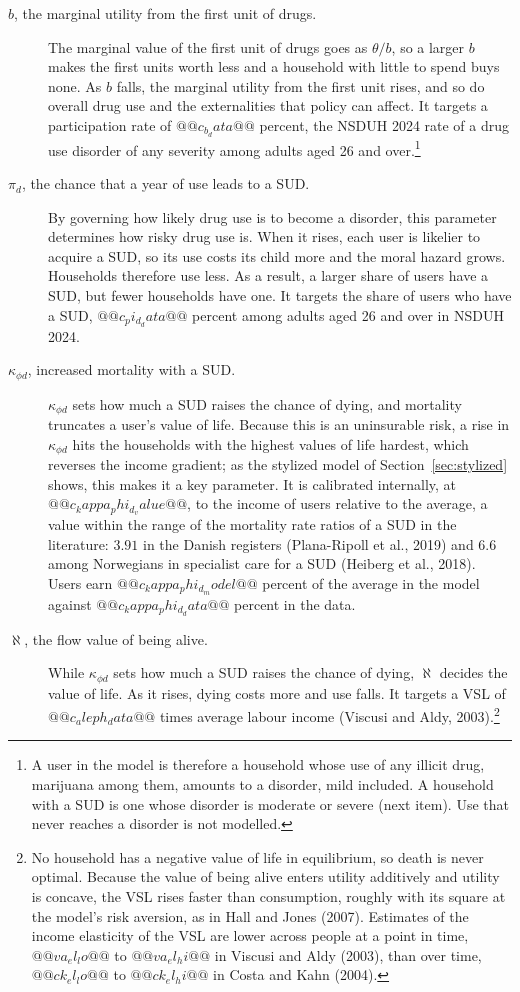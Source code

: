 \documentclass[10pt]{article}
\begin{document}
\begin{description}
\item[$b$, the marginal utility from the first unit of drugs.] The marginal value of the first unit of drugs goes as $\theta/b$, so a larger $b$ makes the first units worth less and a household with little to spend buys none. As $b$ falls, the marginal utility from the first unit rises, and so do overall drug use and the externalities that policy can affect. It targets a participation rate of $@@c_b_data@@$ percent, the NSDUH 2024 rate of a drug use disorder of any severity among adults aged 26 and over.\footnote{A user in the model is therefore a household whose use of any illicit drug, marijuana among them, amounts to a disorder, mild included. A household with a SUD is one whose disorder is moderate or severe (next item). Use that never reaches a disorder is not modelled.}
\item[$\pi_d$, the chance that a year of use leads to a SUD.] By governing how likely drug use is to become a disorder, this parameter determines how risky drug use is. When it rises, each user is likelier to acquire a SUD, so its use costs its child more and the moral hazard grows. Households therefore use less. As a result, a larger share of users have a SUD, but fewer households have one. It targets the share of users who have a SUD, $@@c_pi_d_data@@$ percent among adults aged 26 and over in NSDUH 2024.
\item[$\kappa_{\phi d}$, increased mortality with a SUD.] $\kappa_{\phi d}$ sets how much a SUD raises the chance of dying, and mortality truncates a user's value of life. Because this is an uninsurable risk, a rise in $\kappa_{\phi d}$ hits the households with the highest values of life hardest, which reverses the income gradient; as the stylized model of Section~\ref{sec:stylized} shows, this makes it a key parameter. It is calibrated internally, at $@@c_kappa_phi_d_value@@$, to the income of users relative to the average, a value within the range of the mortality rate ratios of a SUD in the literature: $3.91$ in the Danish registers (Plana-Ripoll et al., 2019) and $6.6$ among Norwegians in specialist care for a SUD (Heiberg et al., 2018). Users earn $@@c_kappa_phi_d_model@@$ percent of the average in the model against $@@c_kappa_phi_d_data@@$ percent in the data.
\item[$\aleph$, the flow value of being alive.]   While $\kappa_{\phi d}$ sets how much a SUD raises the chance of dying, $\aleph$ decides the value of life. As it rises, dying costs more and use falls. It targets a VSL of $@@c_aleph_data@@$ times average labour income (Viscusi and Aldy, 2003).\footnote{No household has a negative value of life in equilibrium, so death is never optimal. Because the value of being alive enters utility additively and utility is concave, the VSL rises faster than consumption, roughly with its square at the model's risk aversion, as in Hall and Jones (2007). Estimates of the income elasticity of the VSL are lower across people at a point in time, $@@va_el_lo@@$ to $@@va_el_hi@@$ in Viscusi and Aldy (2003), than over time, $@@ck_el_lo@@$ to $@@ck_el_hi@@$ in Costa and Kahn (2004).}
\end{description}
\end{document}
